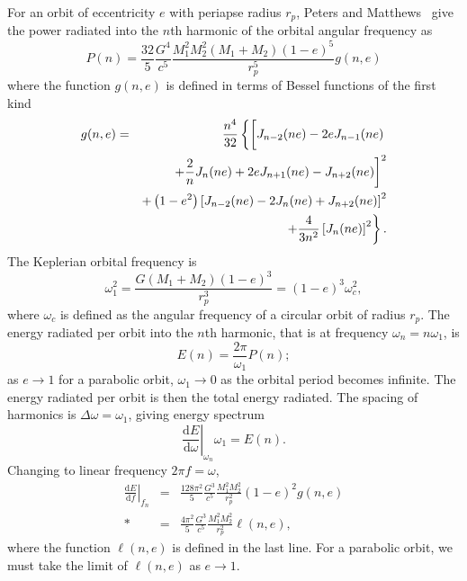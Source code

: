 \documentclass[aps,prd,amsfonts,amssymb,amsmath,nofootinbib,floatfix,reprint,showpacs,groupedaddress]{revtex4-1}
\newcommand{\dd}{\ensuremath{\mathrm{d}}}
\newcommand{\diff}[2]{\ensuremath{\frac{\dd {#1}}{\dd {#2}}}}
\begin{document}
For an orbit of eccentricity $e$ with periapse radius $r_{p}$, Peters and Matthews~\cite{Peters1963} give the power radiated into the $n$th harmonic of the orbital angular frequency as
\begin{equation}
P(n) = \frac{32}{5}\frac{G^4}{c^5}\frac{M_1^2M_2^2(M_1 + M_2)(1-e)^5}{r_{p}^5}g(n,e)
\label{eq:PM_P}
\end{equation}
where the function $g(n,e)$ is defined in terms of Bessel functions of the first kind
\begin{eqnarray}
g(n,e) & = & \frac{n^4}{32}\left\{\left[J_{n-2}(ne) - 2eJ_{n-1}(ne) \vphantom{\frac{2}{n}J_n(ne)} \right. \right. \nonumber \\*
 & & \left. + \frac{2}{n}J_n(ne) + 2eJ_{n+1}(ne) - J_{n+2}(ne)\right]^2 \nonumber \\*
 & & + \left(1 - e^2\right)\left[J_{n-2}(ne) - 2J_n(ne) + J_{n+2}(ne)\right]^2 \nonumber \\*
 & & \left. + \frac{4}{3n^2}\left[J_n(ne)\right]^2\right\}.
\end{eqnarray}
The Keplerian orbital frequency is
\begin{equation}
\omega_1^2 = \frac{G(M_1 + M_2)(1 - e)^3}{r_{p}^3} = (1 - e)^3\omega_{c}^2,
\label{eq:Kepler_freq}
\end{equation}
where $\omega_{c}$ is defined as the angular frequency of a circular orbit of radius $r_{p}$. The energy radiated per orbit into the $n$th harmonic, that is at frequency $\omega_n = n\omega_1$, is
\begin{equation}
E(n) = \frac{2\pi}{\omega_1}P(n);
\label{eq:E(n)}
\end{equation}
as $e \rightarrow 1$ for a parabolic orbit, $\omega_1 \rightarrow 0$ as the orbital period becomes infinite. The energy radiated per orbit is then the total energy radiated. The spacing of harmonics is $\Delta\omega = \omega_1$, giving energy spectrum
\begin{equation}
\left.\diff{E}{\omega}\right|_{\omega_n}\omega_1 = E(n).
\end{equation}
Changing to linear frequency $2\pi f = \omega$,
\begin{eqnarray}
\left.\diff{E}{f}\right|_{f_n} & = & \frac{128\pi^2}{5}\frac{G^3}{c^5}\frac{M_1^2M_2^2}{r_{p}^2}(1-e)^2g(n,e) \\*
 & = & \frac{4\pi^2}{5}\frac{G^3}{c^5}\frac{M_1^2M_2^2}{r_{p}^2}\ell(n,e),
\label{eq:PM_spectrum}
\end{eqnarray}
where the function $\ell(n,e)$ is defined in the last line. For a parabolic orbit, we must take the limit of $\ell(n,e)$ as $e \rightarrow 1$.
\end{document}
